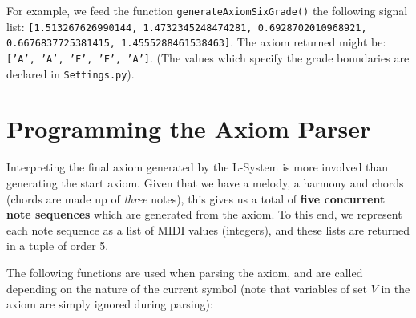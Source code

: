 For example, we feed the function \texttt{generateAxiomSixGrade()} the following signal list: \texttt{[1.513267626990144, 1.4732345248474281, 0.6928702010968921, 0.6676837725381415, 1.4555288461538463]}. The axiom returned might be: \texttt{['A', 'A', 'F', 'F', 'A']}. (The values which specify the grade boundaries are declared in \texttt{Settings.py}).

\section{Programming the Axiom Parser}

Interpreting the final axiom generated by the L-System is more involved than generating the start axiom. Given that we have a melody, a harmony and chords (chords are made up of \textit{three} notes), this gives us a total of \textbf{five concurrent note sequences} which are generated from the axiom. To this end, we represent each note sequence as a list of MIDI values (integers), and these lists are returned in a tuple of order 5.

The following functions are used when parsing the axiom, and are called depending on the nature of the current symbol (note that variables of set $V$ in the axiom are simply ignored during parsing):

